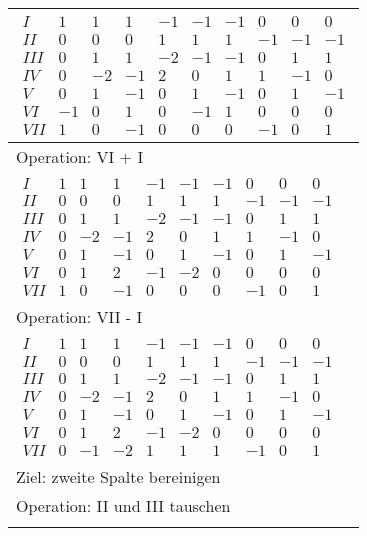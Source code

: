 \begin{longtable}{p{10cm}}
    $\displaystyle\begin{matrix}
    I & 1 & 1 & 1 & -1 & -1 & -1 & 0 & 0 & 0 \\
    II & 0 & 0 & 0 & 1 & 1 & 1 & -1 & -1 & -1 \\
    III & 0 & 1 & 1 & -2 & -1 & -1 & 0 & 1 & 1 \\
    IV & 0 & -2 & -1 & 2 & 0 & 1 & 1 & -1 & 0 \\
    V & 0 & 1 & -1 & 0 & 1 & -1 & 0 & 1 & -1 \\
    VI & -1 & 0 & 1 & 0 & -1 & 1 & 0 & 0 & 0 \\
    VII & 1 & 0 & -1 & 0 & 0 & 0 & -1 & 0 & 1
    \end{matrix}$\\\hline
    Operation: VI + I \\\hline\pagebreak[0]
    $\displaystyle\begin{matrix}
    I & 1 & 1 & 1 & -1 & -1 & -1 & 0 & 0 & 0 \\
    II & 0 & 0 & 0 & 1 & 1 & 1 & -1 & -1 & -1 \\
    III & 0 & 1 & 1 & -2 & -1 & -1 & 0 & 1 & 1 \\
    IV & 0 & -2 & -1 & 2 & 0 & 1 & 1 & -1 & 0 \\
    V & 0 & 1 & -1 & 0 & 1 & -1 & 0 & 1 & -1 \\
    VI & 0 & 1 & 2 & -1 & -2 & 0 & 0 & 0 & 0 \\
    VII & 1 & 0 & -1 & 0 & 0 & 0 & -1 & 0 & 1
    \end{matrix}$\\\hline
    Operation: VII - I \\\hline\pagebreak[0]
    $\displaystyle\begin{matrix}
    I & 1 & 1 & 1 & -1 & -1 & -1 & 0 & 0 & 0 \\
    II & 0 & 0 & 0 & 1 & 1 & 1 & -1 & -1 & -1 \\
    III & 0 & 1 & 1 & -2 & -1 & -1 & 0 & 1 & 1 \\
    IV & 0 & -2 & -1 & 2 & 0 & 1 & 1 & -1 & 0 \\
    V & 0 & 1 & -1 & 0 & 1 & -1 & 0 & 1 & -1 \\
    VI & 0 & 1 & 2 & -1 & -2 & 0 & 0 & 0 & 0 \\
    VII & 0 & -1 & -2 & 1 & 1 & 1 & -1 & 0 & 1
    \end{matrix}$\\\hline
    Ziel: zweite Spalte bereinigen \\\hline\pagebreak[0]
    Operation: II und III tauschen \\\hline\pagebreak[0]

\end{longtable}

